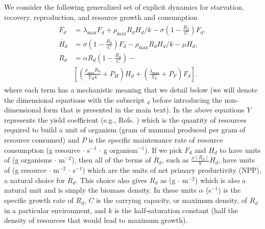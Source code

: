 \documentclass[twocolumn,preprintnumbers,amsmath,amssymb,superscriptaddress]{revtex4}
\begin{document}
\begin{bibunit}[unsrt]
We consider the following generalized set of explicit dynamics for starvation, recovery, reproduction, and resource growth and consumption
\begin{align}
\begin{split}
\dot{F_{d}} &= \lambda_{\text{max}} F_{d} + \rho_{\text{max}}R_{d}H_{d}/k - \sigma \left(1-\frac{R_{d}}{C}\right)F_{d},  \\
\dot{H_{d}} &= \sigma \left(1-\frac{R_{d}}{C}\right)F_{d} - \rho_{\text{max}}R_{d} H_{d}/k - \mu H_{d},  \\
\dot{R_{d}} &= \alpha R_{d}\left(1-\frac{R_{d}}{C}\right) -\\
& \left[\left(\frac{\rho_{\text{max}}R_{d}}{Y_{H}k}+P_{H}\right)H_{d}+\left(\frac{\lambda_{\text{max}}}{Y_{F}}+P_{F}\right)F_{d}\right].
\label{bigdynamics}
\end{split}
\end{align}
where each term has a mechanistic meaning that we detail below (we will denote the dimensional equations with the subscript $_{d}$ before introducing the non-dimensional form that is presented in the main text). In the above equations $Y$ represents the yield coefficient (e.g., Refs. \citep{pirt,Heijnen}) which is the quantity of resources required to build a unit of organism (gram of mammal produced per gram of resource consumed) and $P$ is the specific maintenance rate of resource consumption (g resource $\cdot$ s$^{-1}$ $\cdot$ g organism$^{-1}$). If we pick $F_{d}$ and $H_{d}$ to have units of (g organisms $\cdot$ m$^{-2}$), then all of the terms of $\dot{R_{d}}$, such as $\frac{\rho\left(R_{d}\right)}{Y}H_{d}$, have units of (g resource $\cdot$ m$^{-2}$ $\cdot$ s$^{-1}$) which are the units of net primary productivity (NPP), a natural choice for $\dot{R_{d}}$. This choice also gives $R_{d}$ as (g $\cdot$ m$^{-2}$) which is also a natural unit and is simply the biomass density. In these units $\alpha$ (s$^{-1}$) is the specific growth rate of $R_{d}$, $C$ is the carrying capacity, or maximum density, of $R_{d}$ in a particular environment, and $k$ is the half-saturation constant (half the density of resources that would lead to maximum growth).





\end{bibunit}
\end{document}
